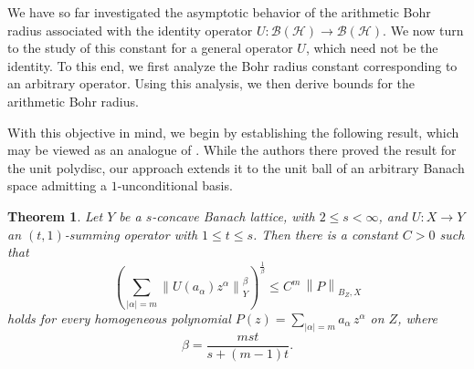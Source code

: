 \documentclass[a4paper,11pt, reqno]{amsart}
\newtheorem{thm}{Theorem}[section]
\theoremstyle{definition}
\newcommand{\norm}[1]{\left\lVert#1\right\rVert}
\begin{document}
	We have so far investigated the asymptotic behavior of the arithmetic Bohr radius associated with the identity operator $U:\mathcal{B}(\mathcal{H}) \rightarrow \mathcal{B}(\mathcal{H})$. We now turn to the study of this constant for a general operator $U$, which need not be the identity. To this end, we first analyze the Bohr radius constant corresponding to an arbitrary operator. Using this analysis, we then derive bounds for the arithmetic Bohr radius.
	\vspace{1mm}
	
	 With this objective in mind, we begin by establishing the following result, which may be viewed as an analogue of \cite[Theorem 5.3]{defant-2012}. While the authors there proved the result for the unit polydisc, our approach extends it to the unit ball of an arbitrary Banach space admitting a $1$-unconditional basis.
	\begin{thm} \label{thm-1.8}
	Let $Y$ be a $s$-concave Banach lattice, with $2\leq s < \infty$, and $U: X \rightarrow Y$ an $(t,1)$-summing operator with $1 \leq t \leq s$. Then there is a constant $C>0$ such that
	\begin{equation*}
	\left(\sum_{|\alpha|=m} \norm{U(a_{\alpha})z^{\alpha}}^{\beta}_{Y}\right)^{\frac{1}{\beta}} \leq C^m \, \norm{P}_{B_{Z},X}
	\end{equation*}
holds for every homogeneous polynomial $P(z)=\sum_{|\alpha|=m} a_{\alpha}\, z^{\alpha}$ on $Z$, where 
\begin{equation*}
\beta= \frac{mst}{s+ (m-1)t}.
\end{equation*}
	\end{thm}
\end{document}
